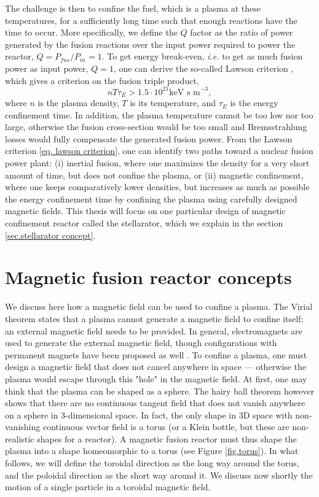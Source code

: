 \documentclass[my_thesis.tex]{subfiles}
\begin{document}
The challenge is then to confine the fuel, which is a plasma at these temperatures, for a sufficiently long time such that enough reactions have the time to occur. More specifically, we define the $Q$ factor as the ratio of power generated by the fusion reactions over the input power required to power the reactor, $Q=P_{fus}/P_{in}=1$. To get energy break-even, \textit{i.e.} to get as much fusion power as input power, $Q=1$, one can derive the so-called Lawson criterion \citep{lawsonCriteriaPowerProducing1957}, which gives a criterion on the fusion triple product,
\begin{equation}
    nT\tau_E > 1.5\cdot 10^{21}\text{keV s m}^{-3}, \label{eq. lawson criterion}
\end{equation} 
where $n$ is the plasma density, $T$ is its temperature, and $\tau_E$ is the energy confinement time. In addition, the plasma temperature cannot be too low nor too large, otherwise the fusion cross-section would be too small and Bremsstrahlung losses would fully compensate the generated fusion power. From the Lawson criterion \ref{eq. lawson criterion}, one can identify two paths toward a nuclear fusion power plant: (i) inertial fusion, where one maximizes the density for a very short amount of time, but does not confine the plasma, or (ii) magnetic confinement, where one keeps comparatively lower densities, but increases as much as possible the energy confinement time by confining the plasma using carefully designed magnetic fields. This thesis will focus on one particular design of magnetic confinement reactor called the stellarator, which we explain in the section \ref{sec.stellarator concept}.


\section{Magnetic fusion reactor concepts} 
We discuss here how a magnetic field can be used to confine a plasma. The Virial theorem \citep{Freidberg2014} states that a plasma cannot generate a magnetic field to confine itself; an external magnetic field needs to be provided. In general, electromagnets are used to generate the external magnetic field, though configurations with permanent magnets have been proposed as well \citep{qianSimplerOptimizedStellarators2022,zhuPM4StellPrototypePermanent2022}. To confine a plasma, one must design a magnetic field that does not cancel anywhere in space --- otherwise the plasma would escape through this "hole" in the magnetic field. At first, one may think that the plasma can be shaped as a sphere. The hairy ball theorem \citep{Renteln2013-uu} however shows that there are no continuous tangent field that does not vanish anywhere on a sphere in 3-dimensional space. In fact, the only shape in 3D space with non-vanishing continuous vector field is a torus (or a Klein bottle, but these are non-realistic shapes for a reactor). A magnetic fusion reactor must thus shape the plasma into a shape homeomorphic to a torus (see Figure \ref{fig.torus}).  In what follows, we will define the toroidal direction as the long way around the torus, and the poloidal direction as the short way around it. We discuss now shortly the motion of a single particle in a toroidal magnetic field.
\end{document}
